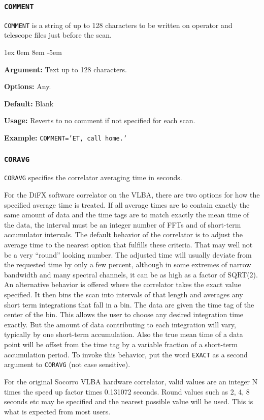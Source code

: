 \documentclass{report}
\newcommand{\rcwbox}[5]{
  \begin{list}{}{\parsep 1ex  \itemsep 0em
                 \leftmargin 8em  \itemindent -5em }
    \item {\bf Argument:} #1
    \item {\bf Options:}  #2
    \item {\bf Default:}  #3
    \item {\bf Usage:}    #4
    \item {\bf Example:}  #5
  \end{list}
}
\begin{document}
\subsubsection{\label{MP:COMMENT}{\tt COMMENT}}

{\tt COMMENT} is a string of up to 128 characters to be written on
operator and telescope files just before the scan.

\rcwbox
{Text up to 128 characters.}
{Any.}
{Blank}
{Reverts to no comment if not specified for each scan.}
{{\tt COMMENT='ET, call home.'}}


\subsubsection{\label{MP:CORAVG}{\tt CORAVG}}

{\tt CORAVG} specifies the correlator averaging time in seconds.

For the DiFX software correlator on the VLBA, there are two options
for how the specified average time is treated.  If all average times
are to contain exactly the same amount of data and the time tags are
to match exactly the mean time of the data, the interval must be
an integer number of FFTs and of short-term accumulator intervals.
The default behavior of the correlator is to adjust the average time
to the nearest option that fulfills these criteria.  That may well not
be a very ``round'' looking number.  The adjusted time will usually
deviate from the requested time by only a few percent, although in some
extremes of narrow bandwidth and many spectral channels, it can be as
high as a factor of SQRT(2).  An alternative behavior is
offered where the correlator takes the exact value specified.  It then
bins the scan into intervals of that length and averages any short
term integrations that fall in a bin.  The data are given the time
tag of the center of the bin.  This allows the user to choose any
desired integration time exactly.  But the amount of data contributing
to each integration will vary, typically by one short-term
accumulation. Also the true mean time of a data point will be offset
from the time tag by a variable fraction of a short-term accumulation
period.  To invoke this behavior, put the word {\tt EXACT} as a second
argument to {\tt CORAVG} (not case sensitive).

For the original Socorro VLBA hardware correlator, valid values are an
integer N times the speed up factor times 0.131072 seconds.  Round
values such as 2, 4, 8 seconds etc may be specified and the nearest
possible value will be used.  This is what is expected from most
users.
\end{document}
